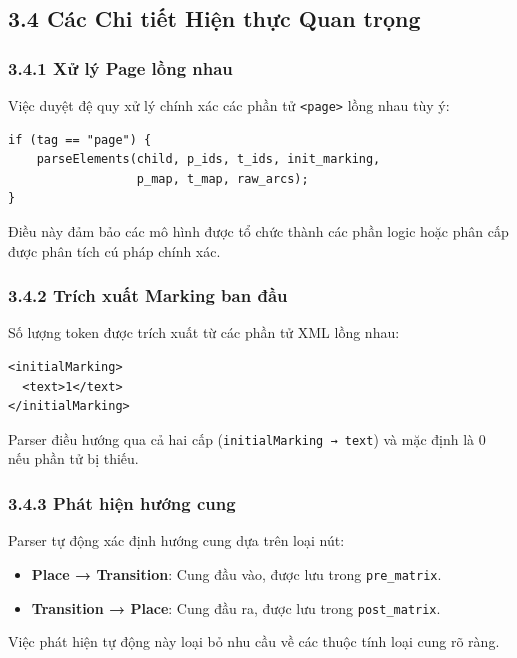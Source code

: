 \documentclass[12pt,a4paper]{article}
\begin{document}
\subsection*{3.4 Các Chi tiết Hiện thực Quan trọng}

\subsubsection*{3.4.1 Xử lý Page lồng nhau}

Việc duyệt đệ quy xử lý chính xác các phần tử \texttt{<page>} lồng nhau tùy ý:

\begin{verbatim}
if (tag == "page") {
    parseElements(child, p_ids, t_ids, init_marking, 
                  p_map, t_map, raw_arcs);
}
\end{verbatim}

Điều này đảm bảo các mô hình được tổ chức thành các phần logic hoặc phân cấp được phân tích cú pháp chính xác.

\subsubsection*{3.4.2 Trích xuất Marking ban đầu}

Số lượng token được trích xuất từ các phần tử XML lồng nhau:

\begin{verbatim}
<initialMarking>
  <text>1</text>
</initialMarking>
\end{verbatim}

Parser điều hướng qua cả hai cấp (\texttt{initialMarking → text}) và mặc định là 0 nếu phần tử bị thiếu.

\subsubsection*{3.4.3 Phát hiện hướng cung}

Parser tự động xác định hướng cung dựa trên loại nút:

\begin{itemize}
    \item \textbf{Place → Transition}: Cung đầu vào, được lưu trong \texttt{pre\_matrix}.
    \item \textbf{Transition → Place}: Cung đầu ra, được lưu trong \texttt{post\_matrix}.
\end{itemize}

Việc phát hiện tự động này loại bỏ nhu cầu về các thuộc tính loại cung rõ ràng.
\end{document}
